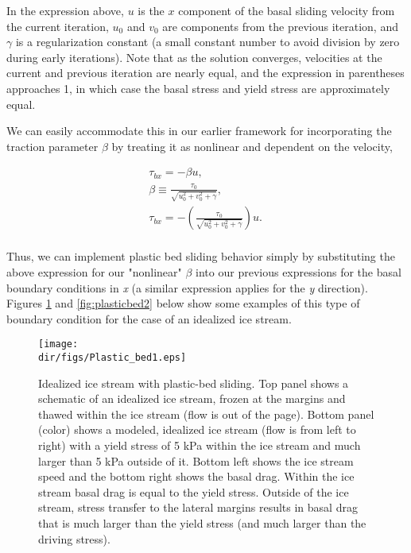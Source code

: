 In the expression above, $u$ is the $x$ component of the basal sliding velocity from the current iteration, $u_0$ and $v_0$ are components from the previous iteration, and $\gamma$ is a regularization constant (a small constant number to avoid division by zero during early iterations). Note that as the solution converges, velocities at the current and previous iteration are nearly equal, and the expression in parentheses approaches 1, in which case the basal stress and yield stress are approximately equal. 

We can easily accommodate this in our earlier framework for incorporating the traction parameter $\beta$ by treating it as nonlinear and dependent on the velocity,

\begin{align*}
  & \tau _{bx}=-\beta u,\quad \quad  \\ 
 & \beta \equiv \frac{\tau _{0}}{\sqrt{u_{0}^{2}+v_{0}^{2}+\gamma }},\quad  \\ 
 & \tau _{bx}=-\left( \frac{\tau _{0}}{\sqrt{u_{0}^{2}+v_{0}^{2}+\gamma }} \right)u.\quad  \\
\end{align*}

Thus, we can implement plastic bed sliding behavior simply by substituting the above expression for our "nonlinear" \textit{{\large \(\beta{}\)}} into our previous expressions for the basal boundary conditions in \textit{x} (a similar expression applies for the \textit{y} direction). Figures \ref{fig:plasticbed1} and \ref{fig:plasticbed2} below show some examples of this type of boundary condition for the case of an idealized ice stream.

\begin{figure}
  \begin{center}
    \texttt{[image: \\dir/figs/Plastic\_bed1.eps]}
  \end{center}
  \caption{Idealized ice stream with plastic-bed sliding. Top panel shows a schematic of an idealized ice stream, frozen at the margins and thawed within the ice stream (flow is out of the page). Bottom panel (color) shows a modeled, idealized ice stream (flow is from left to right) with a yield stress of 5 kPa within the ice stream and much larger than 5 kPa outside of it. Bottom left shows the ice stream speed and the bottom right shows the basal drag. Within the ice stream basal drag is equal to the yield stress. Outside of the ice stream, stress transfer to the lateral margins results in basal drag that is much larger than the yield stress (and much larger than the driving stress).}
  \label{fig:plasticbed1}
\end{figure} 

